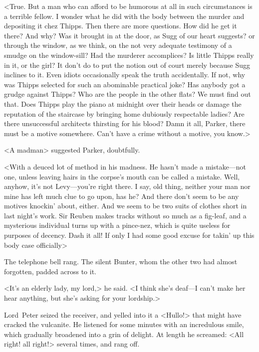 <True. But a man who can afford to be humorous at all in such circumstances is a terrible fellow. I wonder what he did with the body between the murder and depositing it chez Thipps. Then there are more questions. How did he get it there? And why? Was it brought in at the door, as Sugg of our heart suggests? or through the window, as we think, on the not very adequate testimony of a smudge on the window-sill? Had the murderer accomplices? Is little Thipps really in it, or the girl? It don't do to put the notion out of court merely because Sugg inclines to it. Even idiots occasionally speak the truth accidentally. If not, why was Thipps selected for such an abominable practical joke? Has anybody got a grudge against Thipps? Who are the people in the other flats? We must find out that. Does Thipps play the piano at midnight over their heads or damage the reputation of the staircase by bringing home dubiously respectable ladies? Are there unsuccessful architects thirsting for his blood? Damn it all, Parker, there must be a motive somewhere. Can't have a crime without a motive, you know.>

<A madman\longdash> suggested Parker, doubtfully.

<With a deuced lot of method in his madness. He hasn't made a mistake—not one, unless leaving hairs in the corpse's mouth can be called a mistake. Well, anyhow, it's not Levy—you're right there. I say, old thing, neither your man nor mine has left much clue to go upon, has he? And there don't seem to be any motives knockin' about, either. And we seem to be two suits of clothes short in last night's work. Sir Reuben makes tracks without so much as a fig-leaf, and a mysterious individual turns up with a pince-nez, which is quite useless for purposes of decency. Dash it all! If only I had some good excuse for takin' up this body case officially\longdash>

The telephone bell rang. The silent Bunter, whom the other two had almost forgotten, padded across to it.

<It's an elderly lady, my lord,> he said. <I think she's deaf—I can't make her hear anything, but she's asking for your lordship.>

Lord~Peter seized the receiver, and yelled into it a <Hullo!> that might have cracked the vulcanite. He listened for some minutes with an incredulous smile, which gradually broadened into a grin of delight. At length he screamed: <All right! all right!> several times, and rang off.

